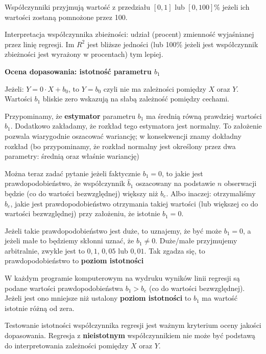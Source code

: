 \documentclass[
  openany]{book}
\begin{document}
Współczynniki przyjmują wartość z przedziału \([0,1]\) lub \([0, 100]\)\% jeżeli
ich wartości zostaną pomnożone przez 100.

Interpretacja współczynnika zbieżności: udział (procent) zmienność wyjaśnianej
przez linię regresji. Im \(R^2\) jest bliższe jedności (lub 100\% jeżeli
jest współczynnik zbieżności jest wyrażony w procentach) tym lepiej.

\textbf{Ocena dopasowania: istotność parametru \(b_1\)}

Jeżeli: \(Y= 0 \cdot X + b_0\), to \(Y = b_0\) czyli nie ma zależności
pomiędzy \(X\) oraz \(Y\).
Wartości \(b_1\) bliskie zero wskazują na słabą zależność
pomiędzy cechami.

Przypominamy, że \textbf{estymator} parametru \(b_1\) ma średnią równą prawdziej wartości \(b_1\).
Dodatkowo zakładamy, że rozkład tego estymatora jest normalny. To założenie
pozwala wiarygodnie oszacować wariancję; w konsekwencji znamy dokładny
rozkład (bo przypominamy, że rozkład
normalny jest określony przez dwa parametry: średnią oraz właśnie wariancję)

Można teraz zadać pytanie jeżeli faktycznie \(b_1=0\), to jakie jest prawdopodobieństwo, że
współczynnik \(\hat b_1\) oszacowany
na podstawie \(n\) obserwacji będzie (co do wartości bezwzględnej) większy niż \(b_e\).
Albo inaczej: otrzymaliśmy \(b_e\), jakie jest prawdopodobieństwo
otrzymania takiej wartości (lub większej co do wartości bezwzględnej)
przy założeniu, że istotnie \(b_1=0\).

Jeżeli takie prawdopodobieństwo jest duże, to uznajemy, że być może \(b_1 = 0\),
a jeżeli małe to będziemy skłonni uznać, że \(b_1 \not= 0\).
Duże/małe przyjmujemy arbitralnie, zwykle
jest to \(0,1\), \(0,05\) lub \(0,01\). Tak zgadza się, to prawdopodobieństwo
to \textbf{poziom istotności}

W każdym programie komputerowym na wydruku wyników linii regresji są podane wartości
prawdopodobieństwa \(b_1 > b_e\) (co do wartości bezwzględnej). Jeżeli jest
ono mniejsze
niż ustalony \textbf{poziom istotności} to \(b_1\) ma wartość istotnie różną od zera.

Testowanie istotności współczynnika regresji jest ważnym kryterium oceny
jakości dopasowania.
Regresja z \textbf{nieistotnym} współczynnikiem nie
może być podstawą do interpretowania zależności pomiędzy \(X\) oraz \(Y\).
\end{document}
